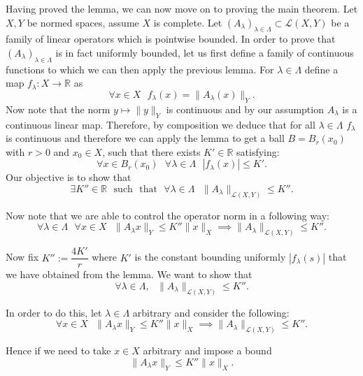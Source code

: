 \documentclass[11pt]{article}
\newcommand\R{\mathbb{R}}
\newcommand\sucht{\sep \mathrm{such} \sep \mathrm{that} \sep}
\newcommand\sep{\text{ }}
\begin{document}
Having proved the lemma, we can now move on to proving the main theorem.
Let $X, Y$ be normed spaces, assume  $X$ is complete. Let
  $\left( A_\lambda \right)_{\lambda \in \Lambda} \subset \mathcal{L}\left( X, Y \right) $
  be a family of linear operators which is pointwise bounded. In order to prove that
  $\left( A_\lambda \right)_{\lambda \in \Lambda} $ is in fact uniformly bounded,
  let us first define a family of continuous functions to which we can then apply the
  previous lemma. For $\lambda \in \Lambda$ define a map  $f_\lambda : X \to \R$ as
   \[
   \forall x \in X \sep f_\lambda(x) = \|A_\lambda(x)\|_Y
  .\]
  Now note that the norm $y \mapsto \|y\|_Y$ is continuous and by our assumption
  $A_\lambda$ is a continuous linear map. Therefore, by composition we deduce that
  for all $\lambda \in \Lambda$  $f_\lambda $ is continuous and therefore we can
  apply the lemma to get a ball  $B = B_r(x_0)$ with  $r > 0$ and  $x_0 \in X$,
  such that  there exists $K' \in \R$ satisfying:
  \begin{equation}
 \forall x \in B_r(x_0) \sep \forall \lambda \in \Lambda \sep |f_\lambda(x)| \le K'
.\end{equation}
 Our objective is to show that
 \[
    \exists K'' \in \R \sucht \forall \lambda \in \Lambda \sep \|A_\lambda \|_{\mathcal{L}\left( X, Y \right) } \le K''
 .\]

 Now note that we are able to control the operator norm in a following way:
 \[
   \forall \lambda \in \Lambda \sep \forall x \in X \sep \|A_\lambda x\|_Y \le K'' \|x\|_X \implies \|A_\lambda\|_{\mathcal{L}\left( X, Y\right)} \le K''
 .\]

 Now fix $K'' := \dfrac{4K'}{r}$ where $K'$ is the constant bounding uniformly $|f_\lambda(s)|$
 that we have obtained from the lemma. We want to show that
 \[
   \forall \lambda \in \Lambda, \sep \|A_\lambda\|_{\mathcal{L}\left( X,Y \right)} \le K''
 .\]

 In order to do this, let $\lambda \in \Lambda$ arbitrary and consider the following:
\[
   \forall x \in X \sep \|A_\lambda x\|_Y \le K'' \|x\|_X \implies \|A_\lambda\|_{\mathcal{L}\left( X, Y\right)} \le K''
.\]

Hence if we need to take $x \in X$ arbitrary and impose a bound
\[
\|A_\lambda x\|_Y \le K'' \|x\|_X
.\]
\end{document}
